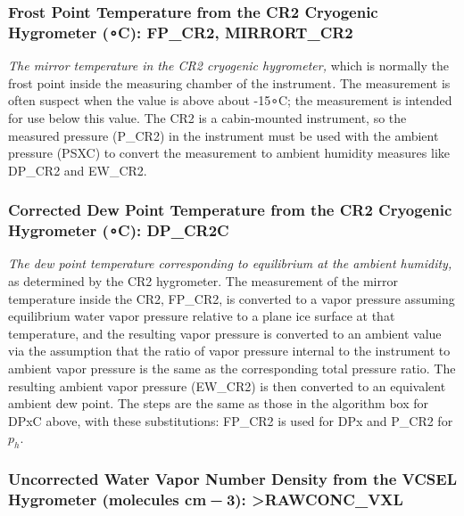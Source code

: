 \documentclass[
]{book}
\begin{document}
\hypertarget{mirror-cr2}{%
\subsubsection*{\texorpdfstring{Frost Point Temperature from the CR2 Cryogenic Hygrometer ({∘}C): FP\_CR2, MIRRORT\_CR2}{Frost Point Temperature from the CR2 Cryogenic Hygrometer (∘C): FP\_CR2, MIRRORT\_CR2}}\label{mirror-cr2}}

\emph{The mirror temperature in the CR2 cryogenic hygrometer,} which is normally the frost point inside the measuring chamber of the instrument\emph{.} The measurement is often suspect when the value is above about -15{∘}C; the measurement is intended for use below this value. The CR2 is a cabin-mounted instrument, so the measured pressure (P\_CR2) in the instrument must be used with the ambient pressure (PSXC) to convert the measurement to ambient humidity measures like DP\_CR2 and EW\_CR2.

\hypertarget{dp-cr2}{%
\subsubsection*{\texorpdfstring{Corrected Dew Point Temperature from the CR2 Cryogenic Hygrometer ({∘}C): DP\_CR2C}{Corrected Dew Point Temperature from the CR2 Cryogenic Hygrometer (∘C): DP\_CR2C}}\label{dp-cr2}}

\emph{The dew point temperature corresponding to equilibrium at the ambient humidity,} as determined by the CR2 hygrometer. The measurement of the mirror temperature inside the CR2, FP\_CR2, is converted to a vapor pressure assuming equilibrium water vapor pressure relative to a plane ice surface at that temperature, and the resulting vapor pressure is converted to an ambient value via the assumption that the ratio of vapor pressure internal to the instrument to ambient vapor pressure is the same as the corresponding total pressure ratio. The resulting ambient vapor pressure (EW\_CR2) is then converted to an equivalent ambient dew point. The steps are the same as those in the algorithm box for DPxC above, with these substitutions: FP\_CR2 is used for DPx and P\_CR2 for \(p_h\).

\hypertarget{vcsel-uncor}{%
\subsubsection*{\texorpdfstring{Uncorrected Water Vapor Number Density from the VCSEL Hygrometer (molecules cm{ − 3}): \textgreater RAWCONC\_VXL}{Uncorrected Water Vapor Number Density from the VCSEL Hygrometer (molecules cm − 3): \textgreater RAWCONC\_VXL}}\label{vcsel-uncor}}
\end{document}
